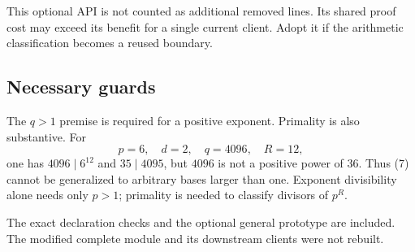 This optional API is not counted as additional removed lines. Its shared
proof cost may exceed its benefit for a single current client. Adopt it
if the arithmetic classification becomes a reused boundary.

\subsection{Necessary guards}

The $q>1$ premise is required for a positive exponent. Primality is also
substantive. For
\[
       p=6,\quad d=2,\quad q=4096,\quad R=12,
\]
one has $4096\mid6^{12}$ and $35\mid4095$, but $4096$ is not a positive power
of $36$. Thus (7) cannot be generalized to arbitrary bases larger than one.
Exponent divisibility alone needs only $p>1$; primality is needed to
classify divisors of $p^R$.

The exact declaration checks and the optional general prototype are
included. The modified complete  module and its
downstream clients were not rebuilt.
